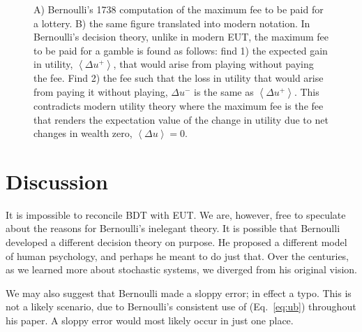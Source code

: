 \documentclass[final]{ectaart}
\newcommand{\ave}[1]{\left\langle#1 \right\rangle}
\newcommand{\eref}[1]{(Eq.~\ref{eq:#1})}
\newcommand{\flabel}[1]{\label{fig:#1}}
\newcommand{\seclabel}[1]{\label{section:#1}}
\newcommand{\Du}{\Delta u}
\theoremstyle{plain}
\begin{document}
\begin{figure}
\begin{picture}
\end{picture}
\caption{\small  A) Bernoulli's 1738 computation of the maximum fee to be paid for a lottery. B) the same figure translated into modern notation. In Bernoulli's decision theory, unlike in modern EUT, the maximum fee to be paid for a gamble is found as follows: find 1) the expected gain in utility, $\ave{\Du^+}$, that would arise from playing without paying the fee. Find 2) the fee such that the loss in utility that would arise from paying it without playing, $\Du^-$ is the same as $\ave{\Du^+}$. This contradicts modern utility theory where the maximum fee is the fee that renders the expectation value of the change in utility due to net changes in wealth zero, $\ave{\Du}=0$.}
\flabel{key}
\end{figure}


\section{Discussion}
\seclabel{Discussion}
It is impossible to reconcile BDT with EUT. 
We are, however, free to speculate about the reasons for Bernoulli's inelegant theory. It is possible that Bernoulli developed a different decision theory on purpose. He proposed a different model of human psychology, and perhaps he meant to do just that. Over the centuries, as we learned more about stochastic systems, we diverged from his original vision. 

We may also suggest that Bernoulli made a sloppy error; in effect a typo. This is not a likely scenario, due to Bernoulli's consistent use of \eref{ub} throughout his paper. A sloppy error would most likely occur in just one place.
\end{document}
